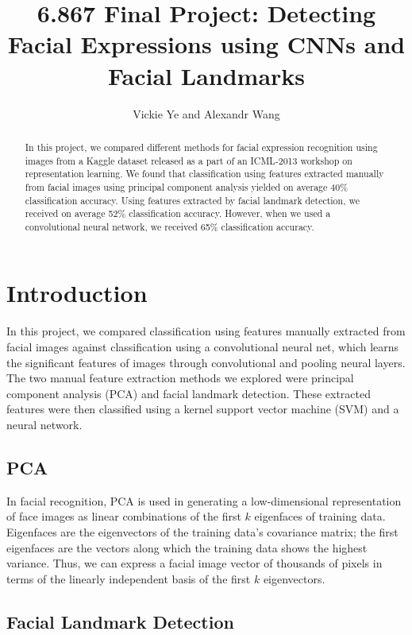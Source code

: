 \documentclass[10pt, twocolumn, twoside]{article}
\title{6.867 Final Project: Detecting Facial Expressions using CNNs and Facial Landmarks} %
\date{}
\author {Vickie Ye and Alexandr Wang}
\begin{document}
\maketitle


\begin{abstract}
In this project, we compared different methods for facial expression recognition
using images from a Kaggle dataset released as a part of an ICML-2013 workshop
on representation learning.
We found that classification using features extracted manually from facial images
using principal component analysis yielded on average 40\% classification accuracy.
Using features extracted by facial landmark detection, we received on average 52\%
classification accuracy. However, when we used a convolutional neural network, we
received 65\% classification accuracy.
\end{abstract}

\section{Introduction}

In this project, we compared classification using features manually extracted from
facial images against classification using a convolutional neural net, which learns
the significant features of images through convolutional and pooling neural layers.
The two manual feature extraction methods we explored were principal component
analysis (PCA) and facial landmark detection. These extracted features were then
classified using a kernel support vector machine (SVM) and a neural network.

\subsection{PCA}

In facial recognition, PCA is used in generating a low-dimensional representation of
face images as linear combinations of the first $k$ eigenfaces of training data.
Eigenfaces are the eigenvectors of the training data's covariance matrix; the first
eigenfaces are the vectors along which the training data shows the highest variance.
Thus, we can express a facial image vector of thousands of pixels in terms of
the linearly independent basis of the first $k$ eigenvectors. 

\subsection{Facial Landmark Detection}
\end{document}
